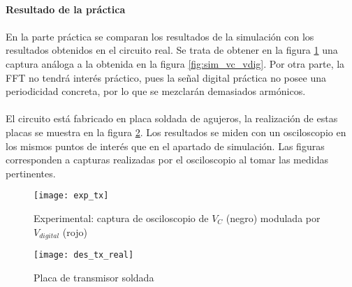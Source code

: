 \paragraph{Resultado de la pr\'actica} %
\paragraph{}
En la parte práctica se comparan los resultados de la simulación con los resultados obtenidos en el circuito real. 
Se trata de obtener en la figura \ref{fig:exp_vc_vdig} una captura an\'aloga a la obtenida en la figura \ref{fig:sim_vc_vdig}.
Por otra parte, la FFT no tendr\'a interés práctico, pues la señal digital práctica no posee una periodicidad concreta, por lo que se mezclarán demasiados armónicos.
\paragraph{}
El circuito está fabricado en placa soldada de agujeros, la realizaci\'on de estas placas se muestra en la figura \ref{fig:exp_placa_tx}. Los resultados se miden con un osciloscopio en los mismos puntos de interés que en el apartado de simulación. Las figuras corresponden a capturas realizadas por el osciloscopio al tomar las medidas pertinentes.

\begin{figure}[h!]
    \centering
    \texttt{[image: exp\_tx]}
    \caption{Experimental: captura de osciloscopio de $V_C$ (negro) modulada por $V_{digital}$ (rojo)}
    \label{fig:exp_vc_vdig}
\end{figure}

\begin{figure}[h!]
    \centering
    \texttt{[image: des\_tx\_real]}
    \caption{Placa de transmisor soldada}
    \label{fig:exp_placa_tx}
\end{figure}

